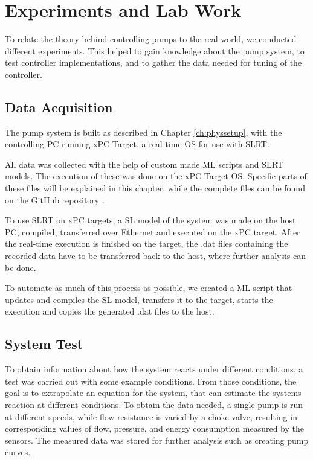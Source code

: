 \chapter{Experiments and Lab Work}\label{ch:experiment}
To relate the theory behind controlling pumps to the real world,
we conducted different experiments.
This helped to gain knowledge about the pump system,
to test controller implementations, and to gather the data needed for tuning of the controller.

\section{Data Acquisition}\label{sec:data_gathering}
The pump system is built as described in Chapter \ref{ch:physsetup},
with the controlling PC running xPC Target,
a real-time OS for use with SLRT. 

All data was collected with the help of custom made 
ML scripts and SLRT models.
The execution of these was done on the xPC Target OS.
Specific parts of these files will be explained in this chapter,
while the complete files can be found on the GitHub repository \cite{GitHub}.

To use SLRT on xPC targets, a SL model of the system was made on the host PC,
compiled, transferred over Ethernet and executed on the xPC target.
After the real-time execution is finished on the target,
the .dat files containing the recorded data have to be transferred back to the host,
where further analysis can be done.

To automate as much of this process as possible,
we created a ML script that updates and compiles the SL model, transfers it to the target,
starts the execution and copies the generated .dat files to the host.

\section{System Test}\label{sec:system_test} 
To obtain information about how the system reacts under different conditions,
a test was carried out with some example conditions.
From those conditions, the goal is to extrapolate an equation for the system,
that can estimate the systems reaction at different conditions.
To obtain the data needed,
a single pump is run at different speeds,
while flow resistance is varied by a choke valve,
resulting in corresponding values of flow, pressure, and energy consumption
measured by the sensors.
The measured data was stored for further analysis such as creating pump curves.


